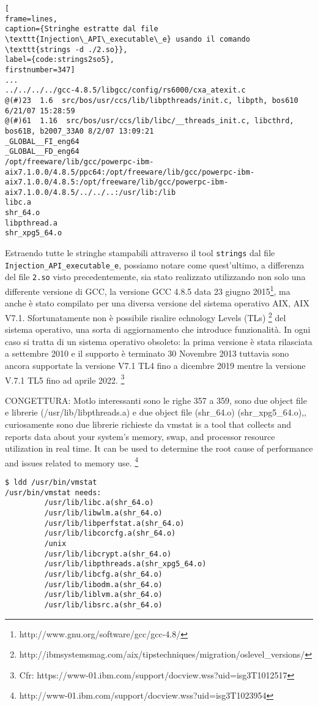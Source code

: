 \documentclass[10pt,a4paper, titlepage]{report}
\begin{document}
\begin{lstlisting}[
frame=lines, 
caption={Stringhe estratte dal file \texttt{Injection\_API\_executable\_e} usando il comando \texttt{strings -d ./2.so}}, 
label={code:strings2so5},
firstnumber=347]
...
../../../../gcc-4.8.5/libgcc/config/rs6000/cxa_atexit.c
@(#)23  1.6  src/bos/usr/ccs/lib/libpthreads/init.c, libpth, bos610 6/21/07 15:28:59
@(#)61	1.16  src/bos/usr/ccs/lib/libc/__threads_init.c, libcthrd, bos61B, b2007_33A0 8/2/07 13:09:21
_GLOBAL__FI_eng64
_GLOBAL__FD_eng64
/opt/freeware/lib/gcc/powerpc-ibm-aix7.1.0.0/4.8.5/ppc64:/opt/freeware/lib/gcc/powerpc-ibm-aix7.1.0.0/4.8.5:/opt/freeware/lib/gcc/powerpc-ibm-aix7.1.0.0/4.8.5/../../..:/usr/lib:/lib
libc.a
shr_64.o
libpthread.a
shr_xpg5_64.o
\end{lstlisting}

Estraendo tutte le stringhe stampabili attraverso il tool \texttt{strings} dal file \texttt{Injection\_API\_executable\_e}, 
possiamo notare come quest'ultimo, 
a differenza del file \texttt{2.so} visto precedentemente, sia stato realizzato utilizzando non solo una differente versione di GCC, la versione GCC 4.8.5 data 23 giugno 2015\footnote{http://www.gnu.org/software/gcc/gcc-4.8/}, ma anche è stato compilato per una diversa versione del sistema operativo AIX, AIX V7.1. 
Sfortunatamente non è possibile risalire echnology Levels (TLs) \footnote{http://ibmsystemsmag.com/aix/tipstechniques/migration/oslevel\_versions/} del sistema operativo, una sorta di aggiornamento che introduce funzionalità. In ogni caso si tratta di un sistema operativo obsoleto: la prima versione è stata rilasciata a settembre 2010 e il supporto è terminato 30 Novembre 2013 tuttavia sono ancora supportate la versione V7.1 TL4 fino a dicembre 2019 mentre la versione V.7.1 TL5 fino ad aprile 2022. \footnote{Cfr: https://www-01.ibm.com/support/docview.wss?uid=isg3T1012517}

CONGETTURA:
Motlo interessanti sono le righe 357 a 359, sono due object file e librerie (/usr/lib/libpthreads.a) e due object file (shr\_64.o) (shr\_xpg5\_64.o),, curiosamente sono due librerie richieste da vmstat is a tool that collects and reports data about your system’s memory, swap, and processor resource utilization in real time. It can be used to determine the root cause of performance and issues related to memory use. \footnote{http://www-01.ibm.com/support/docview.wss?uid=isg3T1023954}

\begin{lstlisting}
$ ldd /usr/bin/vmstat
/usr/bin/vmstat needs:
         /usr/lib/libc.a(shr_64.o)
         /usr/lib/libwlm.a(shr_64.o)
         /usr/lib/libperfstat.a(shr_64.o)
         /usr/lib/libcorcfg.a(shr_64.o)
         /unix
         /usr/lib/libcrypt.a(shr_64.o)
         /usr/lib/libpthreads.a(shr_xpg5_64.o)
         /usr/lib/libcfg.a(shr_64.o)
         /usr/lib/libodm.a(shr_64.o)
         /usr/lib/liblvm.a(shr_64.o)
         /usr/lib/libsrc.a(shr_64.o)
\end{lstlisting}
\end{document}

